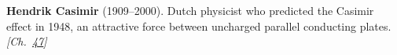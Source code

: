 \textbf{Hendrik Casimir} (1909–2000). Dutch physicist who predicted the Casimir effect in 1948, an attractive force between uncharged parallel conducting plates. \emph{[Ch.~\hyperref[ch:observervac]{47}]}


